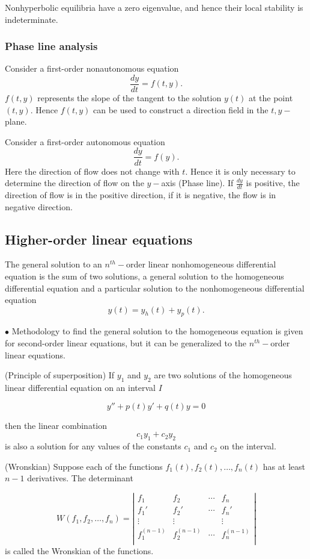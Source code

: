 Nonhyperbolic equilibria have a zero eigenvalue, and hence their local stability is indeterminate.


\subsubsection{Phase line analysis}
Consider a first-order nonautonomous equation
$$\frac{dy}{dt}=f(t,y).$$
$f(t,y)$ represents the slope of the tangent to the solution $y(t)$ at the point $(t,y)$. Hence $f(t,y)$ can be used to construct a direction field in the $t,y-$plane.

Consider a first-order autonomous equation
$$\frac{dy}{dt}=f(y).$$
Here the direction of flow does not change with $t$. Hence it is only necessary to determine the direction of flow on the $y-$axis (Phase line). If $\frac{dy}{dt}$ is positive, the direction of flow is in the positive direction, if it is negative, the flow is in negative direction.



\subsection{Higher-order linear equations}
The general solution to an $n^{th}-$order linear nonhomogeneous differential equation is the sum of two solutions, a general solution to the homogeneous differential equation and a particular solution to the nonhomogeneous differential equation
$$y(t)=y_h(t)+y_p(t).$$ 



{\bf $\bullet$} Methodology to find the general solution to the homogeneous equation is given for second-order linear equations, but it can be generalized to the $n^{th}-$order linear equations.


\begin{theorem} (Principle of superposition)
If $y_1$ and $y_2$ are two solutions of the homogeneous linear differential
equation on an interval $I$


$$y''+p(t)y'+q(t)y=0$$

then the linear combination $$c_1y_1+c_2y_2$$ is also a solution for
any values of the constants $c_1$ and $c_2$ on the interval.
\end{theorem}

\begin{definition}(Wronskian)
Suppose each of the functions $f_1(t),
f_2(t), \dots, f_n(t)$ has at least $n-1$ derivatives. The
determinant

$$W(f_1,f_2,\dots,f_n)=\left |
\begin{array}{llll}
f_1 & f_2 & \cdots & f_n\\
f_1' & f_2' & \cdots & f_n'\\
\vdots & \vdots & &\vdots\\
f_1^{(n-1)} & f_2^{(n-1)} & \cdots & f_n^{(n-1)}\\
\end{array}
\right |$$ is called the Wronskian of the functions.
\end{definition}


